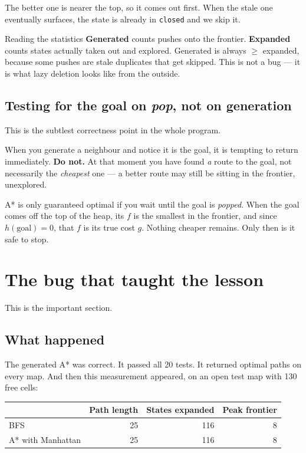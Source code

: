 \documentclass[11pt,a4paper]{article}
\begin{document}
The better one is nearer the top, so it comes out first. When the stale one
eventually surfaces, the state is already in \texttt{closed} and we skip it.

\begin{keyidea}{Reading the statistics}
\textbf{Generated} counts pushes onto the frontier. \textbf{Expanded} counts
states actually taken out and explored. Generated is always $\geq$ expanded,
because some pushes are stale duplicates that get skipped. This is not a bug ---
it is what lazy deletion looks like from the outside.
\end{keyidea}

\subsection{Testing for the goal on \emph{pop}, not on generation}

This is the subtlest correctness point in the whole program.

When you generate a neighbour and notice it is the goal, it is tempting to return
immediately. \textbf{Do not.} At that moment you have found \emph{a} route to the
goal, not necessarily the \emph{cheapest} one --- a better route may still be
sitting in the frontier, unexplored.

A* is only guaranteed optimal if you wait until the goal is \emph{popped}. When
the goal comes off the top of the heap, its $f$ is the smallest in the frontier,
and since $h(\text{goal}) = 0$, that $f$ is its true cost $g$. Nothing cheaper
remains. Only then is it safe to stop.

\section{The bug that taught the lesson}

This is the important section.

\subsection{What happened}

The generated A* was correct. It passed all 20 tests. It returned optimal paths
on every map. And then this measurement appeared, on an open test map with 130
free cells:

\begin{center}
\begin{tabular}{@{}lrrr@{}}
\toprule
& \textbf{Path length} & \textbf{States expanded} & \textbf{Peak frontier} \\
\midrule
BFS               & 25 & 116 & 8 \\
A* with Manhattan & 25 & 116 & 8 \\
\bottomrule
\end{tabular}
\end{center}
\end{document}
